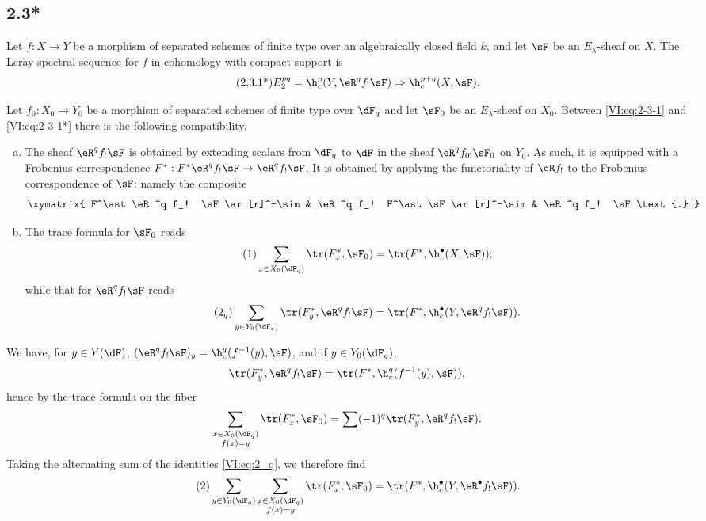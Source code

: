 \documentclass[oneside]{book}
\begin{document}
\subsection*{2.3*}\label{VI:2-3*}

Let $f:X\to Y$ be a morphism of separated schemes of finite type over an 
algebraically closed field $k$, and let $\sF$ be an $E_\lambda$-sheaf on $X$. The 
Leray spectral sequence for $f$ in cohomology with compact support is 
\begin{align*}\tag{2.3.1*}\label{VI:eq:2-3-1*}
  E_2^{p q} = \h_c^p(Y,\eR^q f_! \sF) \Rightarrow \h_c^{p+q}(X,\sF) \text{.}
\end{align*}

Let $f_0:X_0 \to Y_0$ be a morphism of separated schemes of finite type over 
$\dF_q$ and let $\sF_0$ be an $E_\lambda$-sheaf on $X_0$. Between 
\eqref{VI:eq:2-3-1} and \eqref{VI:eq:2-3-1*} there is the following compatibility. 

\begin{enumerate}[a)]
  \item The sheaf $\eR^q f_! \sF$ is obtained by extending scalars from 
    $\dF_q$ to $\dF$ in the sheaf $\eR^q f_{0!} \sF_0$ on $Y_0$. As 
    such, it is equipped with a Frobenius correspondence 
    $F^\ast:F^\ast\eR^q f_! \sF \to \eR^q f_! \sF$. It is obtained by applying 
    the functoriality of $\eR f_!$ to the Frobenius correspondence of $\sF$: 
    namely the composite 
    \[\xymatrix{
      F^\ast \eR^q f_! \sF \ar[r]^-\sim 
        & \eR^q f_! F^\ast \sF \ar[r]^-\sim 
        & \eR^q f_! \sF \text{.}
    }\]
  \item The trace formula for $\sF_0$ reads 
    \begin{align*}\tag{1}\label{VI:eq:1}
      \sum_{x\in X_0(\dF_q)} \tr(F_x^\ast,\sF_0) = \tr(F^\ast,\h_c^\bullet(X,\sF)) \text{;}
    \end{align*}
    while that for $\eR^q f_! \sF$ reads 
    \begin{align*}\tag{2$_q$}\label{VI:eq:2_q} 
      \sum_{y\in Y_0(\dF_q)} \tr(F_y^\ast,\eR^q f_! \sF) = \tr(F^\ast, \h_c^\bullet(Y,\eR^q f_! \sF)) \text{.}
    \end{align*}
\end{enumerate}

We have, for $y\in Y(\dF)$, $(\eR^q f_! \sF)_y = \h_c^q(f^{-1}(y),\sF)$, and if 
$y\in Y_0(\dF_q)$, 
\[
  \tr(F_y^\ast,\eR^q f_! \sF) = \tr(F^\ast,\h_c^q(f^{-1}(y),\sF)) \text{,}
\]
hence by the trace formula on the fiber 
\[
  \sum_{\substack{x\in X_0(\dF_q) \\ f(x) = y}} \tr(F_x^\ast,\sF_0) = \sum (-1)^q \tr(F_y^\ast,\eR^q f_! \sF) \text{.}
\]
Taking the alternating sum of the identities \eqref{VI:eq:2_q}, we therefore find 
\begin{align*}\tag{2}\label{VI:eq:2}
  \sum_{y\in Y_0(\dF_q)} \sum_{\substack{x \in X_0(\dF_q) \\ f(x) = y}} \tr(F_x^\ast,\sF_0) = \tr(F^\ast,\h_c^\bullet(Y,\eR^\bullet f_! \sF)) \text{.}
\end{align*}
\end{document}
